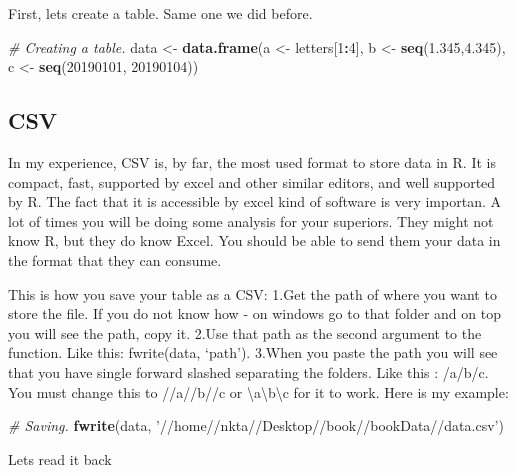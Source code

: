 \documentclass[]{book}
\newenvironment{Shaded}{\begin{snugshade}}{\end{snugshade}}
\newcommand{\CommentTok}[1]{\textcolor[rgb]{0.56,0.35,0.01}{\textit{#1}}}
\newcommand{\DecValTok}[1]{\textcolor[rgb]{0.00,0.00,0.81}{#1}}
\newcommand{\FloatTok}[1]{\textcolor[rgb]{0.00,0.00,0.81}{#1}}
\newcommand{\KeywordTok}[1]{\textcolor[rgb]{0.13,0.29,0.53}{\textbf{#1}}}
\newcommand{\NormalTok}[1]{#1}
\newcommand{\OperatorTok}[1]{\textcolor[rgb]{0.81,0.36,0.00}{\textbf{#1}}}
\newcommand{\StringTok}[1]{\textcolor[rgb]{0.31,0.60,0.02}{#1}}
\begin{document}
First, lets create a table. Same one we did before.

\begin{Shaded}
\begin{Highlighting}[]
\CommentTok{# Creating a table.}
\NormalTok{data <-}\StringTok{ }\KeywordTok{data.frame}\NormalTok{(a <-}\StringTok{ }\NormalTok{letters[}\DecValTok{1}\OperatorTok{:}\DecValTok{4}\NormalTok{],}
\NormalTok{                      b <-}\StringTok{ }\KeywordTok{seq}\NormalTok{(}\FloatTok{1.345}\NormalTok{,}\FloatTok{4.345}\NormalTok{),}
\NormalTok{                      c <-}\StringTok{ }\KeywordTok{seq}\NormalTok{(}\DecValTok{20190101}\NormalTok{, }\DecValTok{20190104}\NormalTok{))}
\end{Highlighting}
\end{Shaded}

\hypertarget{csv}{%
\subsection{CSV}\label{csv}}

In my experience, CSV is, by far, the most used format to store data in R. It is compact, fast, supported by excel and other similar editors, and well supported by R. The fact that it is accessible by excel kind of software is very importan. A lot of times you will be doing some analysis for your superiors. They might not know R, but they do know Excel. You should be able to send them your data in the format that they can consume.

This is how you save your table as a CSV: 1.Get the path of where you want to store the file. If you do not know how - on windows go to that folder and on top you will see the path, copy it. 2.Use that path as the second argument to the function. Like this: fwrite(data, `path'). 3.When you paste the path you will see that you have single forward slashed separating the folders. Like this : /a/b/c. You must change this to //a//b//c or \textbackslash{}a\textbackslash{}b\textbackslash{}c for it to work. Here is my example:

\begin{Shaded}
\begin{Highlighting}[]
\CommentTok{# Saving.}
\KeywordTok{fwrite}\NormalTok{(data, }\StringTok{'//home//nkta//Desktop//book//bookData//data.csv'}\NormalTok{)}
\end{Highlighting}
\end{Shaded}

Lets read it back
\end{document}
